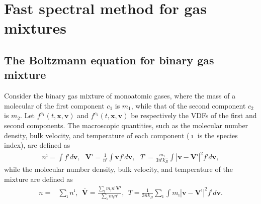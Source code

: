 \chapter{Fast spectral method for gas mixtures}
\label{chap:double}

\section{The Boltzmann equation for binary gas mixture}

Consider the binary gas mixture of monoatomic gases, where the mass of a molecular of the first component $c_1$ is $m_1$, while that of the second component $c_2$ is $m_2$. Let $f^{c_1}(t,\textbf{x},\textbf{v})$ and $f^{c_2}(t,\textbf{x},\textbf{v})$ be respectively the VDFs of the first  and second components. The macroscopic quantities, such as the molecular number density, bulk velocity, and temperature of each component ($\imath$ is the species index), are defined as
\begin{equation}
\begin{aligned}
n^\imath=\int f^\imath{d\textbf{v}},\ \ \
\textbf{V}^\imath=\frac{1}{n^\imath}\int{}\textbf{v}f^\imath{}d\textbf{v},\ \ \
T^\imath=\frac{m_\imath}{3n^\imath{}k_B}\int{}|\textbf{v}-\textbf{V}^\imath|^2f^\imath{}d\textbf{v},
\end{aligned}
\end{equation}
while the molecular number density, bulk velocity, and temperature of the mixture are defined as
\begin{equation}
\begin{aligned}
n=&\sum_{\imath}n^\imath,\ \
\overline{\textbf{V}}=\frac{\sum_{\imath}m_\imath{n^\imath}\textbf{V}^\imath}{\sum_{\imath}m_\imath{n^\imath}},\ \
T=\frac{1}{3n{}k_B}\sum_{\imath}\int{}m_\imath|\textbf{v}-\textbf{V}^\imath|^2f^\imath{}d\textbf{v}.
\end{aligned}
\end{equation}


